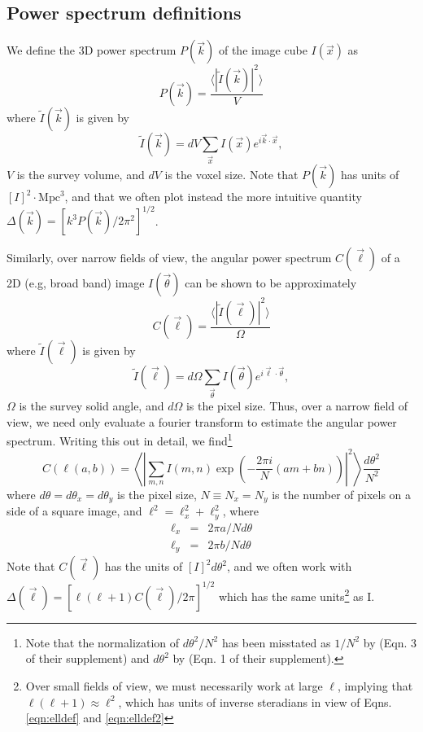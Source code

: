\documentclass{emulateapj}
\begin{document}
\subsection{Power spectrum definitions}
\label{sec:pspecdefs}

We define the 3D power spectrum $P(\vec{k})$ of the image cube $I(\vec{x})$ as 
\begin{equation}
\label{eqn:pspec3Ddef}
	P(\vec{k}) = \frac{\langle|\tilde{I}(\vec{k})|^2\rangle}{V}
\end{equation}
where $\tilde{I}(\vec{k})$ is given by
\begin{equation}
	\tilde{I}(\vec{k})=dV\sum_{\vec{x}}I(\vec{x})e^{i\vec{k}\cdot\vec{x}},
\end{equation}
$V$ is the survey volume, and $dV$ is the voxel size. Note that $P(\vec{k})$ has units of $[I]^2\cdot\text{Mpc}^3$, and that we often plot instead the more intuitive quantity $\Delta(\vec{k})=[k^3P(\vec{k})/2\pi^2]^{1/2}$.

Similarly, over narrow fields of view, the angular power spectrum $C(\vec{\ell})$ of a 2D (e.g, broad band) image $I(\vec{\theta})$ can be shown to be approximately
\begin{equation}
\label{eqn:Cldef0}
	C(\vec{\ell}) = \frac{\langle|\tilde{I}(\vec{\ell})|^2\rangle}{\Omega} 
\end{equation}
where $\tilde{I}(\vec{\ell})$ is given by
\begin{equation}
	\tilde{I}(\vec{\ell})=d\Omega\sum_{\vec{\theta}}I(\vec{\theta})e^{i\vec{\ell}\cdot\vec{\theta}},
\end{equation}
$\Omega$ is the survey solid angle, and $d\Omega$ is the pixel size. Thus, over a narrow field of view, we need only evaluate a fourier transform to estimate the angular power spectrum. Writing this out in detail, we find\footnote{Note that the normalization of $d\theta^2/N^2$ has been misstated as $1/N^2$ by \citet{zemcov14} (Eqn. 3 of their supplement) and $d\theta^2$ by \citet{cooray12} (Eqn. 1 of their supplement).} 
\begin{equation}
\label{eqn:Cldef}
	C(\ell(a,b))=\left\langle\left|\sum_{m,n}I(m,n)\exp\left(-\frac{2\pi i}{N}  (am+bn)\right)\right|^2\right\rangle\frac{d\theta^2}{N^2}
\end{equation}
where $d\theta=d\theta_x=d\theta_y$ is the pixel size, $N\equiv N_x=N_y$ is the number of pixels on a side of a square image, and $\ell^2=\ell_x^2+\ell_y^2$, where 
\begin{eqnarray}
\ell_x&=&2\pi a/N d\theta \label{eqn:elldef}\\
\ell_y&=&2\pi b/Nd\theta \label{eqn:elldef2}
\end{eqnarray}
Note that $C(\vec{\ell})$ has the units of $[I]^2d\theta^2$, and we often work with $\Delta(\vec{\ell})=[\ell(\ell+1)C(\vec{\ell})/2\pi]^{1/2}$ which has the same units\footnote{Over small fields of view, we must necessarily work at large $\ell$, implying that $\ell(\ell+1)\approx\ell^2$, which has units of inverse steradians in view of Eqns. \ref{eqn:elldef} and \ref{eqn:elldef2}} as I.
\end{document}
